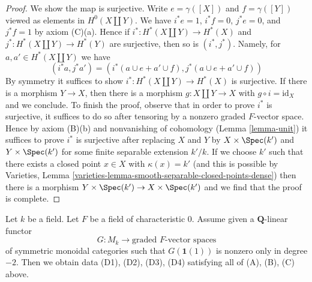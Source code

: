 \begin{proof}
\medskip\noindent
We show the map is surjective. Write $e = \gamma([X])$ and $f = \gamma([Y])$
viewed as elements in $H^0(X \amalg Y)$. We have
$i^*e = 1$, $i^*f = 0$, $j^*e = 0$, and $j^*f = 1$ by axiom (C)(a).
Hence if $i^* : H^*(X \amalg Y) \to  H^*(X)$
and $j^* : H^*(X \amalg Y) \to H^*(Y)$ are surjective, then
so is $(i^*, j^*)$. Namely, for $a, a' \in H^*(X \amalg Y)$
we have
$$
(i^*a, j^*a') = (i^*(a \cup e + a' \cup f), j^*(a \cup e + a' \cup f))
$$
By symmetry it suffices to show $i^* : H^*(X \amalg Y) \to  H^*(X)$
is surjective. If there is a morphism $Y \to X$, then there is a morphism
$g : X \amalg Y \to X$ with $g \circ i = \text{id}_X$ and we conclude.
To finish the proof, observe that in order to prove
$i^*$ is surjective, it suffices to do so after tensoring
by a nonzero graded $F$-vector space. Hence by axiom (B)(b)
and nonvanishing of cohomology (Lemma \ref{lemma-unit})
it suffices to prove $i^*$ is surjective after replacing
$X$ and $Y$ by $X \times \Spec(k')$ and $Y \times \Spec(k')$
for some finite separable extension $k'/k$.
If we choose $k'$ such that there exists a closed point
$x \in X$ with $\kappa(x) = k'$ (and this is possible by
Varieties, Lemma \ref{varieties-lemma-smooth-separable-closed-points-dense})
then there is a morphism $Y \times \Spec(k') \to X \times \Spec(k')$
and we find that the proof is complete.
\end{proof}

\begin{lemma}
\label{lemma-from-functor-to-weil}
Let $k$ be a field. Let $F$ be a field of characteristic $0$.
Assume given a $\mathbf{Q}$-linear functor
$$
G : M_k \longrightarrow \text{graded }F\text{-vector spaces}
$$
of symmetric monoidal categories such that $G(\mathbf{1}(1))$
is nonzero only in degree $-2$. Then we obtain data (D1), (D2), (D3), (D4)
satisfying all of (A), (B), (C) above.
\end{lemma}

